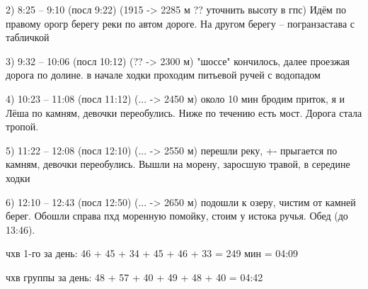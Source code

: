2) 8:25 -- 9:10 (посл 9:22)  (1915 -> 2285 м ?? уточнить высоту в гпс) Идём по правому орогр берегу реки по автом дороге. На другом берегу -- погранзастава с табличкой

3) 9:32 -- 10:06 (посл 10:12) (?? -> 2300 м) "шоссе" кончилось, далее проезжая дорога по долине. в начале ходки проходим питьевой ручей с водопадом

4) 10:23 -- 11:08 (посл 11:12) (... -> 2450 м) около 10 мин бродим приток, я и Лёша по камням, девочки переобулись. Ниже по течению есть мост. Дорога стала тропой.

5) 11:22 -- 12:08 (посл 12:10) (... -> 2550 м) перешли реку, +- прыгается по камням, девочки переобулись. Вышли на морену, заросшую травой, в середине ходки

6) 12:10 -- 12:43 (посл 12:50) (... -> 2650 м) подошли к озеру, чистим от камней берег. Обошли справа пхд моренную помойку, стоим у истока ручья. Обед (до 13:46).

чхв 1-го за день: 46 + 45 + 34 + 45 + 46 + 33 = 249 мин = 04:09

чхв группы за день: 48 + 57 + 40 + 49 + 48 + 40 = 04:42


    \FloatBarrier
